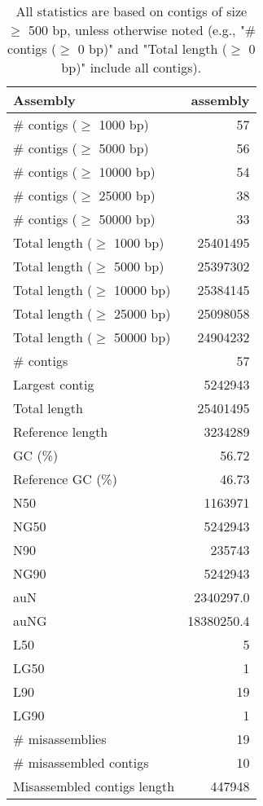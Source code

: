 \documentclass[12pt,a4paper]{article}
\begin{document}
\begin{table}[ht]
\begin{center}
\caption{All statistics are based on contigs of size $\geq$ 500 bp, unless otherwise noted (e.g., "\# contigs ($\geq$ 0 bp)" and "Total length ($\geq$ 0 bp)" include all contigs).}
\begin{tabular}{|l*{1}{|r}|}
\hline
Assembly & assembly \\ \hline
\# contigs ($\geq$ 1000 bp) & 57 \\ \hline
\# contigs ($\geq$ 5000 bp) & 56 \\ \hline
\# contigs ($\geq$ 10000 bp) & 54 \\ \hline
\# contigs ($\geq$ 25000 bp) & 38 \\ \hline
\# contigs ($\geq$ 50000 bp) & 33 \\ \hline
Total length ($\geq$ 1000 bp) & 25401495 \\ \hline
Total length ($\geq$ 5000 bp) & 25397302 \\ \hline
Total length ($\geq$ 10000 bp) & 25384145 \\ \hline
Total length ($\geq$ 25000 bp) & 25098058 \\ \hline
Total length ($\geq$ 50000 bp) & 24904232 \\ \hline
\# contigs & 57 \\ \hline
Largest contig & 5242943 \\ \hline
Total length & 25401495 \\ \hline
Reference length & 3234289 \\ \hline
GC (\%) & 56.72 \\ \hline
Reference GC (\%) & 46.73 \\ \hline
N50 & 1163971 \\ \hline
NG50 & 5242943 \\ \hline
N90 & 235743 \\ \hline
NG90 & 5242943 \\ \hline
auN & 2340297.0 \\ \hline
auNG & 18380250.4 \\ \hline
L50 & 5 \\ \hline
LG50 & 1 \\ \hline
L90 & 19 \\ \hline
LG90 & 1 \\ \hline
\# misassemblies & 19 \\ \hline
\# misassembled contigs & 10 \\ \hline
Misassembled contigs length & 447948 \\ \hline

\end{tabular}
\end{center}
\end{table}
\end{document}
